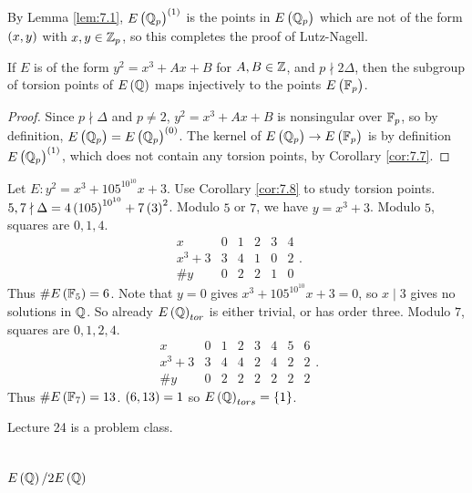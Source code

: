 By Lemma \ref{lem:7.1}, $ E\br{\Q_p}^{\br{1}} $ is the points in $ E\br{\Q_p} $ which are not of the form $ \br{x, y} $ with $ x, y \in \mathbb{Z}_p $, so this completes the proof of Lutz-Nagell.

\begin{corollary}
\label{cor:7.8}
If $ E $ is of the form $ y^2 = x^3 + Ax + B $ for $ A, B \in \mathbb{Z} $, and $ p \nmid 2\Delta $, then the subgroup of torsion points of $ E\br{\Q} $ maps injectively to the points $ E\br{\F_p} $.
\end{corollary}

\begin{proof}
Since $ p \nmid \Delta $ and $ p \ne 2 $, $ y^2 = x^3 + Ax + B $ is nonsingular over $ \mathbb{F}_p $, so by definition, $ E\br{\Q_p} = E\br{\Q_p}^{\br{0}} $. The kernel of $ E\br{\Q_p} \to E\br{\F_p} $ is by definition $ E\br{\Q_p}^{\br{1}} $, which does not contain any torsion points, by Corollary \ref{cor:7.7}.
\end{proof}

\begin{example*}
Let $ E : y^2 = x^3 + 105^{10^{10}}x + 3 $. Use Corollary \ref{cor:7.8} to study torsion points. $ 5, 7 \nmid \Delta = 4\br{105}^{10^{10}} + 7\br{3}^2 $. Modulo $ 5 $ or $ 7 $, we have $ y = x^3 + 3 $. Modulo $ 5 $, squares are $ 0, 1, 4 $.
$$
\begin{array}{c|ccccc}
x & 0 & 1 & 2 & 3 & 4 \\
\hline
x^3 + 3 & 3 & 4 & 1 & 0 & 2 \\
\#y & 0 & 2 & 2 & 1 & 0
\end{array}.
$$
Thus $ \#E\br{\F_5} = 6 $. Note that $ y = 0 $ gives $ x^3 + 105^{10^{10}}x + 3 = 0 $, so $ x \mid 3 $ gives no solutions in $ \mathbb{Q} $. So already $ E\br{\Q}_{tor} $ is either trivial, or has order three. Modulo $ 7 $, squares are $ 0, 1, 2, 4 $.
$$
\begin{array}{c|ccccccc}
x & 0 & 1 & 2 & 3 & 4 & 5 & 6 \\
\hline
x^3 + 3 & 3 & 4 & 4 & 2 & 4 & 2 & 2 \\
\#y & 0 & 2 & 2 & 2 & 2 & 2 & 2
\end{array}.
$$
Thus $ \#E\br{\F_7} = 13 $. $ \br{6, 13} = 1 $ so $ E\br{\Q}_{tors} = \cbr{1} $.
\end{example*}


Lecture 24 is a problem class.

\pagebreak

\section{$ E\br{\Q} / 2E\br{\Q} $}

